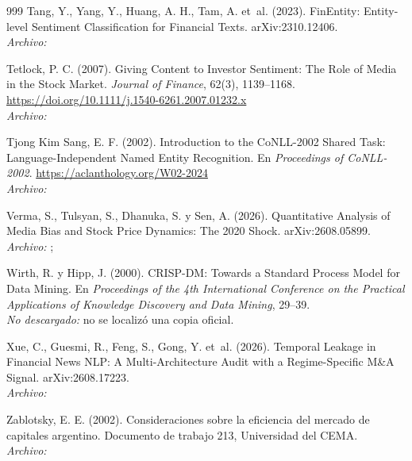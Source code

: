 \begin{thebibliography}{999}
Tang, Y., Yang, Y., Huang, A. H., Tam, A. et~al. (2023). {FinEntity}: Entity-level Sentiment Classification for Financial Texts. arXiv:2310.12406.
\\\textit{Archivo:} 

Tetlock, P. C. (2007). Giving Content to Investor Sentiment: The Role of Media in the Stock Market. \emph{Journal of Finance}, 62(3), 1139--1168. \url{https://doi.org/10.1111/j.1540-6261.2007.01232.x}
\\\textit{Archivo:} 

Tjong Kim Sang, E. F. (2002). Introduction to the {CoNLL-2002} Shared Task: Language-Independent Named Entity Recognition. En \emph{Proceedings of CoNLL-2002}. \url{https://aclanthology.org/W02-2024}
\\\textit{Archivo:} 

Verma, S., Tulsyan, S., Dhanuka, S. y Sen, A. (2026). Quantitative Analysis of Media Bias and Stock Price Dynamics: The 2020 Shock. arXiv:2608.05899.
\\\textit{Archivo:} ; 

Wirth, R. y Hipp, J. (2000). {CRISP-DM}: Towards a Standard Process Model for Data Mining. En \emph{Proceedings of the 4th International Conference on the Practical Applications of Knowledge Discovery and Data Mining}, 29--39.
\\\textit{No descargado:} no se localizó una copia oficial.

Xue, C., Guesmi, R., Feng, S., Gong, Y. et~al. (2026). Temporal Leakage in Financial News {NLP}: A Multi-Architecture Audit with a Regime-Specific {M\&A} Signal. arXiv:2608.17223.
\\\textit{Archivo:} 

Zablotsky, E. E. (2002). Consideraciones sobre la eficiencia del mercado de capitales argentino. Documento de trabajo 213, Universidad del CEMA.
\\\textit{Archivo:} 

\end{thebibliography}
